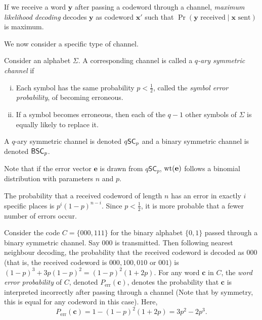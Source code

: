 \begin{definition}
    If we receive a word $\textbf{y}$ after passing a codeword through a channel, \textit{maximum likelihood decoding} decodes $\textbf{y}$ as codeword $\textbf{x}'$ such that $\Pr(\textbf{y}\text{ received}\mid \textbf{x}\text{ sent})$ is maximum.
\end{definition}

\vspace{2mm}
We now consider a specific type of channel.

\begin{definition}
    Consider an alphabet $\Sigma$. A corresponding channel is called a 
    \textit{$q$-ary symmetric channel} if
    \begin{enumerate}[(i)]
        \item Each symbol has the same probability $p<\frac{1}{2}$, called the \textit{symbol error probability}, of becoming erroneous.
        \item If a symbol becomes erroneous, then each of the $q-1$ other symbols of $\Sigma$ is equally likely to replace it.
    \end{enumerate}
\end{definition}

A $q$-ary symmetric channel is denoted $q\mathsf{SC}_p$ and a binary symmetric channel is denoted $\mathsf{BSC}_p$.

Note that if the error vector $\textbf{e}$ is drawn from $q\mathsf{SC}_p$, $\operatorname{wt}(\textbf{e})$ follows a binomial distribution with parameters $n$ and $p$.

\vspace{2mm}
The probability that a received codeword of length $n$ has an error in exactly $i$ specific places is $p^{i}(1-p)^{n-i}$. Since $p<\frac{1}{2}$, it is more probable that a fewer number of errors occur.

\vspace{2mm}
Consider the code $C=\{000,111\}$ for the binary alphabet $\{0,1\}$ passed through a binary symmetric channel. Say $000$ is transmitted. Then following nearest neighbour decoding, the probability that the received codeword is decoded as $000$ (that is, the received codeword is $000,100,010$ or $001$) is $(1-p)^3+3p(1-p)^2=(1-p)^2(1+2p)$. For any word $\textbf{c}$ in $C$, the \textit{word error probability} of $C$, denoted $P_\text{err}(\textbf{c})$, denotes the probability that $\textbf{c}$ is interpreted incorrectly after passing through a channel (Note that by symmetry, this is equal for any codeword in this case). Here,
$$P_\text{err}(\textbf{c})=1-(1-p)^2(1+2p)=3p^2-2p^3.$$

